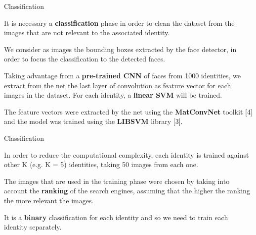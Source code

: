 \begin{tframe}{Classification}

It is necessary a \textbf{classification} phase in order to clean the dataset from the images that are not relevant to the associated identity.

\vspace{0.1in}

We consider as images the bounding boxes extracted by the face detector, in order to focus the classification to the detected faces.

\vspace{0.1in}

Taking advantage from a \textbf{pre-trained CNN} of faces from 1000 identities, we extract from the net the last layer of convolution as feature vector for each images in the dataset. For each identity, a \textbf{linear SVM} will be trained.

\vspace{0.1in}

The feature vectors were extracted by the net using the \textbf{MatConvNet} toolkit [4] and the model was trained using the \textbf{LIBSVM} library [3].

\end{tframe}


\begin{tframe}{Classification}

In order to reduce the computational complexity, each identity is trained against other K (e.g. K = 5) identities, taking 50 images from each one.

\vspace{0.1in}

The images that are used in the training phase were chosen by taking into account the \textbf{ranking} of the search engines, assuming that the higher the ranking the more relevant the images.

\vspace{0.1in}

It is a \textbf{binary} classification for each identity and so we need to train each identity separately.

\end{tframe}